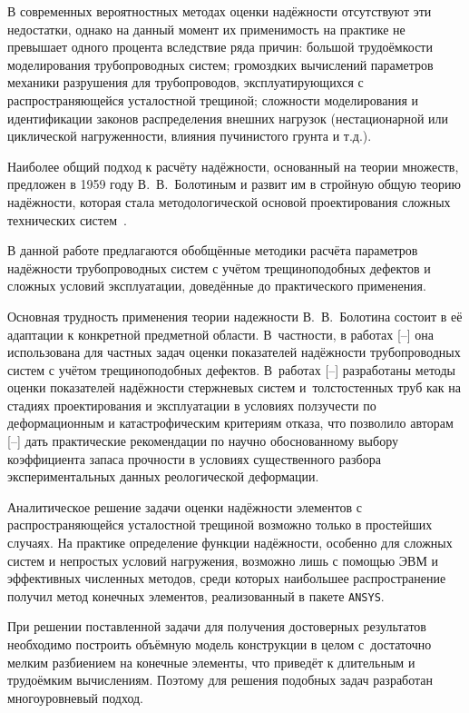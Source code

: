 В современных вероятностных методах оценки надёжности отсутствуют эти
недостатки, однако на данный момент их применимость на практике не превышает
одного процента вследствие ряда причин: большой трудоёмкости моделирования
трубопроводных систем; громоздких вычислений параметров механики разрушения
для трубопроводов, эксплуатирующихся с распространяющейся усталостной
трещиной; сложности моделирования и идентификации законов распределения
внешних нагрузок (нестационарной или циклической нагруженности, влияния
пучинистого грунта и т.д.).

Наиболее общий подход к расчёту надёжности, основанный на теории множеств, предложен в 1959 году В.~В.~Болотиным и развит им в стройную общую теорию надёжности, которая стала методологической
основой проектирования сложных технических
систем~\cite{tsapurin:bib1}.

В данной работе предлагаются обобщённые методики расчёта параметров надёжности трубопроводных систем с учётом трещиноподобных дефектов и сложных условий эксплуатации, доведённые до практического применения.

Основная трудность применения теории надежности В.~В.~Болотина состоит в её адаптации к конкретной предметной области. 
В~частности, в работах [--] она использована для частных задач оценки показателей надёжности трубопроводных систем с учётом трещиноподобных дефектов. В~работах [--] разработаны методы оценки показателей надёжности стержневых систем и~толстостенных труб как на стадиях проектирования и эксплуатации в
условиях ползучести по деформационным и катастрофическим критериям отказа, что позволило авторам
[--] дать практические рекомендации по научно обоснованному выбору коэффициента запаса прочности в условиях существенного разбора экспериментальных данных реологической деформации.

Аналитическое решение задачи оценки надёжности элементов с распространяющейся усталостной трещиной
возможно только в простейших случаях. На практике определение
функции надёжности, особенно для сложных систем и непростых
условий нагружения, возможно лишь с помощью ЭВМ и эффективных
численных методов, среди которых наибольшее распространение
получил метод конечных элементов, реализованный в пакете
{\tt ANSYS}.

При решении поставленной задачи для получения достоверных результатов необходимо построить объёмную модель конструкции в целом с~достаточно мелким разбиением на конечные элементы, что приведёт к длительным и
трудоёмким вычислениям. Поэтому для решения подобных задач разработан
многоуровневый подход.

